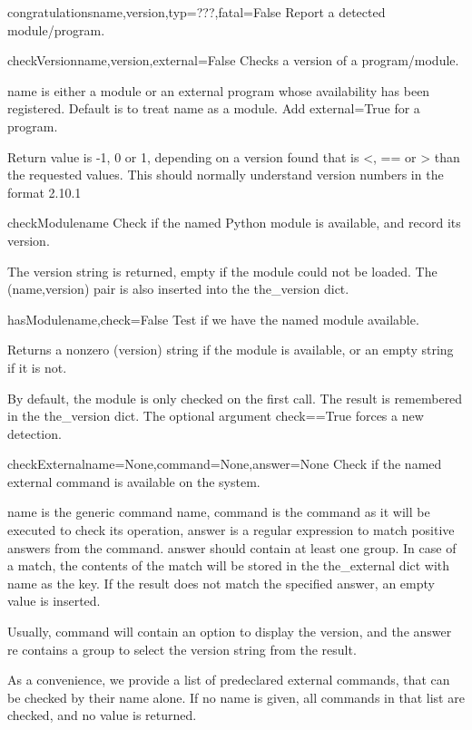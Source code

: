 \begin{funcdesc}{congratulations}{name,version,typ=???,fatal=False}
Report a detected module/program.

\end{funcdesc}


\begin{funcdesc}{checkVersion}{name,version,external=False}
Checks a version of a program/module.

    name is either a module or an external program whose availability has
    been registered.
    Default is to treat name as a module. Add external=True for a program.

    Return value is -1, 0 or 1, depending on a version found that is
    <, == or > than the requested values.
    This should normally understand version numbers in the format 2.10.1
    

\end{funcdesc}


\begin{funcdesc}{checkModule}{name}
Check if the named Python module is available, and record its version.

    The version string is returned, empty if the module could not be loaded.
    The (name,version) pair is also inserted into the the_version dict.
    

\end{funcdesc}


\begin{funcdesc}{hasModule}{name,check=False}
Test if we have the named module available.

    Returns a nonzero (version) string if the module is available,
    or an empty string if it is not.

    By default, the module is only checked on the first call. 
    The result is remembered in the the_version dict.
    The optional argument check==True forces a new detection.
    

\end{funcdesc}


\begin{funcdesc}{checkExternal}{name=None,command=None,answer=None}
Check if the named external command is available on the system.

    name is the generic command name,
    command is the command as it will be executed to check its operation,
    answer is a regular expression to match positive answers from the command.
    answer should contain at least one group. In case of a match, the
    contents of the match will be stored in the the_external dict
    with name as the key. If the result does not match the specified answer,
    an empty value is inserted.

    Usually, command will contain an option to display the version, and
    the answer re contains a group to select the version string from
    the result.

    As a convenience, we provide a list of predeclared external commands,
    that can be checked by their name alone.
    If no name is given, all commands in that list are checked, and no
    value is returned.
    

\end{funcdesc}


